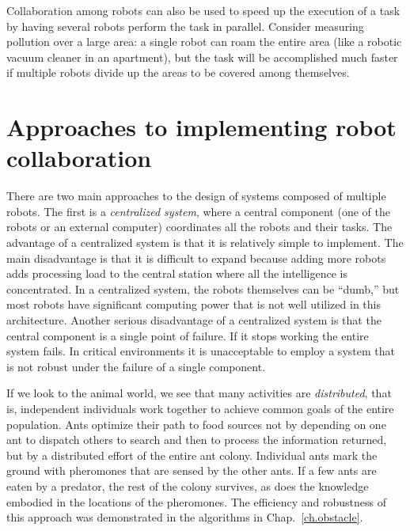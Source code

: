 Collaboration among robots can also be used to speed up the execution of a task by having several robots perform the task in parallel. Consider measuring pollution over a large area: a single robot can roam the entire area (like a robotic vacuum cleaner in an apartment), but the task will be accomplished much faster if multiple robots divide up the areas to be covered among themselves.

\section{Approaches to implementing robot collaboration}

There are two main approaches to the design of systems composed of multiple robots. The first is a \textit{centralized system}, where a central component (one of the robots or an external computer) coordinates all the robots and their tasks. The advantage of a centralized system is that it is relatively simple to implement. The main disadvantage is that it is difficult to expand because adding more robots adds processing load to the central station where all the intelligence is concentrated. In a centralized system, the robots themselves can be ``dumb,'' but most robots have significant computing power that is not well utilized in this architecture. Another serious disadvantage of a centralized system is that the central component is a single point of failure. If it stops working the entire system fails. In critical environments it is unacceptable to employ a system that is not robust under the failure of a single component.

If we look to the animal world, we see that many activities are \emph{distributed}, that is, independent individuals work together to achieve common goals of the entire population. Ants optimize their path to food sources not by depending on one ant to dispatch others to search and then to process the information returned, but by a distributed effort of the entire ant colony. Individual ants mark the ground with pheromones that are sensed by the other ants. If a few ants are eaten by a predator, the rest of the colony survives, as does the knowledge embodied in the locations of the pheromones. The efficiency and robustness of this approach was demonstrated in the algorithms in Chap.~\ref{ch.obstacle}.

